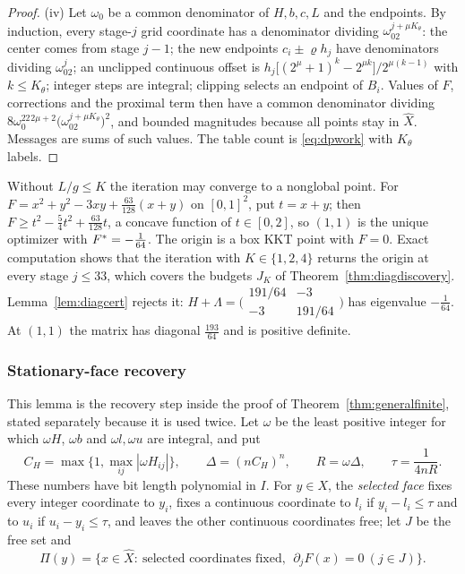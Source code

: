 \begin{proof}
(iv) Let $\omega_0$ be a common denominator of $H,b,c,L$ and the endpoints.
By induction, every stage-$j$ grid coordinate has a denominator dividing
$\omega_02^{j+\mu K_\theta}$: the center comes from stage $j-1$; the new
endpoints $c_i\pm\varrho h_j$ have denominators dividing $\omega_02^j$; an
unclipped continuous offset is
$h_j\bigl[(2^\mu+1)^k-2^{\mu k}\bigr]/2^{\mu(k-1)}$ with $k\le K_\theta$;
integer steps are integral; clipping selects an endpoint of $B_i$. Values of
$F$, corrections and the proximal term then have a common denominator
dividing $8\omega_0^22^{2\mu+2}\bigl(\omega_02^{j+\mu K_\theta}\bigr)^2$, and
bounded magnitudes because all points stay in $\hat X$. Messages are sums of
such values. The table count is \eqref{eq:dpwork} with $K_\theta$ labels.
\end{proof}

\begin{remark}\label{rem:falseguess}
Without $L/g\le K$ the iteration may converge to a nonglobal point. For
$F=x^2+y^2-3xy+\frac{63}{128}(x+y)$ on $[0,1]^2$, put $t=x+y$; then
$F\ge t^2-\frac54t^2+\frac{63}{128}t$, a concave function of $t\in[0,2]$, so
$(1,1)$ is the unique optimizer with $F^*=-\frac1{64}$. The origin is a box
KKT point with $F=0$. Exact computation shows that the iteration with
$K\in\{1,2,4\}$ returns the origin at every stage $j\le33$, which covers the
budgets $J_K$ of Theorem~\ref{thm:diagdiscovery}. Lemma~\ref{lem:diagcert}
rejects it: $H+\Lambda=\bigl(\begin{smallmatrix}191/64&-3\\-3&191/64\end{smallmatrix}\bigr)$
has eigenvalue $-\frac1{64}$. At $(1,1)$ the matrix has diagonal $\frac{193}{64}$
and is positive definite.
\end{remark}

\subsubsection{Stationary-face recovery}

This lemma is the recovery step inside the proof of
Theorem~\ref{thm:generalfinite}, stated separately because it is used twice.
Let $\omega$ be the least positive integer for which $\omega H$, $\omega b$
and $\omega l,\omega u$ are integral, and put
\[
C_H=\max\{1,\max_{ij}|\omega H_{ij}|\},\qquad\Delta=(nC_H)^n,\qquad
R=\omega\Delta,\qquad\tau=\frac1{4nR}.
\]
These numbers have bit length polynomial in $I$. For $y\in X$, the
\emph{selected face} fixes every integer coordinate to $y_i$, fixes a
continuous coordinate to $l_i$ if $y_i-l_i\le\tau$ and to $u_i$ if
$u_i-y_i\le\tau$, and leaves the other continuous coordinates free; let $J$ be
the free set and
\[
\Pi(y)=\{x\in\hat X:\ \text{selected coordinates fixed},\ \ \partial_jF(x)=0\ (j\in J)\}.
\]


